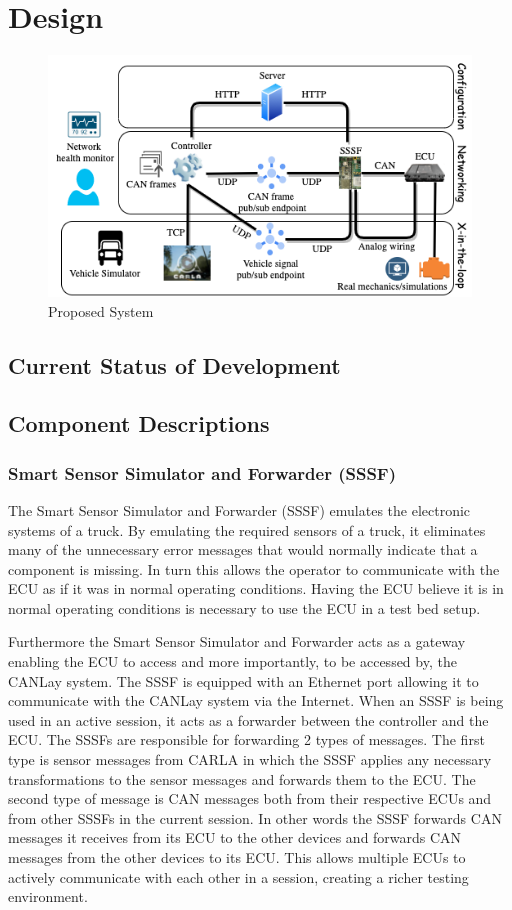 \documentclass[letterpaper,twocolumn,12pt]{article}
\begin{document}
\section{Design}
\begin{figure}[t!]
    \centering
    \includegraphics[width=\linewidth]{images/system_design.drawio.png}
    \caption{Proposed System}
    \label{fig:goal}
\end{figure}

\subsection{Current Status of Development}

\subsection{Component Descriptions}
\subsubsection{Smart Sensor Simulator and Forwarder (SSSF)}
The Smart Sensor Simulator and Forwarder (SSSF) emulates the electronic systems of a truck. By emulating the required sensors of a truck, it eliminates many of the unnecessary error messages that would normally indicate that a component is missing. In turn this allows the operator to communicate with the ECU as if it was in normal operating conditions. Having the ECU believe it is in normal operating conditions is necessary to use the ECU in a test bed setup. 

Furthermore the Smart Sensor Simulator and Forwarder acts as a gateway enabling the ECU to access and more importantly, to be accessed by, the CANLay system. The SSSF is equipped with an Ethernet port allowing it to communicate with the CANLay system via the Internet. When an SSSF is being used in an active session, it acts as a forwarder between the controller and the ECU. The SSSFs are responsible for forwarding 2 types of messages. The first type is sensor messages from CARLA in which the SSSF applies any necessary transformations to the sensor messages and forwards them to the ECU. The second type of message is CAN messages both from their respective ECUs and from other SSSFs in the current session. In other words the SSSF forwards CAN messages it receives from its ECU to the other devices and forwards CAN messages from the other devices to its ECU. This allows multiple ECUs to actively communicate with each other in a session, creating a richer testing environment.
\end{document}
